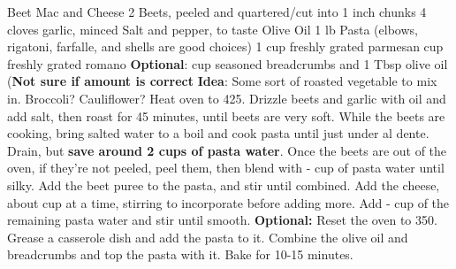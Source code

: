 \documentclass[../cookbook.tex]{subfiles}
\begin{document}
\begin{recipe}{Beet Mac and Cheese}
\ingredients
{2 Beets, peeled and quartered/cut into 1 inch chunks}
{4 cloves garlic, minced}
{Salt and pepper, to taste}
{Olive Oil}
{1 lb Pasta (elbows, rigatoni, farfalle, and shells are good choices)}
{1 cup freshly grated parmesan}
{ cup freshly grated romano}
{\textbf{Optional}:  cup seasoned breadcrumbs and 1 Tbsp olive oil (\textbf{Not sure if amount is correct}}
{\textbf{Idea}: Some sort of roasted vegetable to mix in. Broccoli? Cauliflower?}
\stopingredients
\preparation
{Heat oven to 425\degree.}
{Drizzle beets and garlic with oil and add salt, then roast for 45 minutes, until beets are very soft.}
{While the beets are cooking, bring salted water to a boil and cook pasta until just under al dente. Drain, but \textbf{save around 2 cups of pasta water}.}
{Once the beets are out of the oven, if they're not peeled, peel them, then blend with - cup of pasta water until silky.}
{Add the beet puree to the pasta, and stir until combined.}
{Add the cheese, about  cup at a time, stirring to incorporate before adding more. Add - cup of the remaining pasta water and stir until smooth.}
{\textbf{Optional:} Reset the oven to 350\degree. Grease a casserole dish and add the pasta to it. Combine the olive oil and breadcrumbs and top the pasta with it. Bake for 10-15 minutes.}
\stopprep
\end{recipe}
\end{document}
